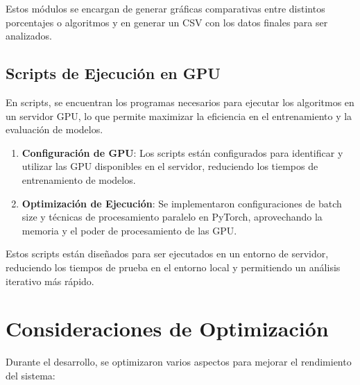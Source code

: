 Estos módulos se encargan de generar gráficas comparativas entre distintos porcentajes o algoritmos y en
generar un CSV con los datos finales para ser analizados.

\subsection{Scripts de Ejecución en GPU}\label{subsec:scripts-de-ejecucion-en-gpu}
En scripts, se encuentran los programas necesarios para ejecutar los algoritmos en un servidor GPU, lo que permite
maximizar la eficiencia en el entrenamiento y la evaluación de modelos.
\begin{enumerate}
      \item \textbf{Configuración de GPU}: Los scripts están configurados para identificar y utilizar las GPU disponibles
            en el servidor, reduciendo los tiempos de entrenamiento de modelos.
      \item \textbf{Optimización de Ejecución}: Se implementaron configuraciones de batch size y técnicas de
            procesamiento paralelo en PyTorch, aprovechando la memoria y el poder de procesamiento de las GPU\@.
\end{enumerate}

Estos scripts están diseñados para ser ejecutados en un entorno de servidor, reduciendo los tiempos de prueba en el
entorno local y permitiendo un análisis iterativo más rápido.


\section{Consideraciones de Optimización}\label{sec:consideraciones-de-optimizacion}
Durante el desarrollo, se optimizaron varios aspectos para mejorar el rendimiento del sistema:

